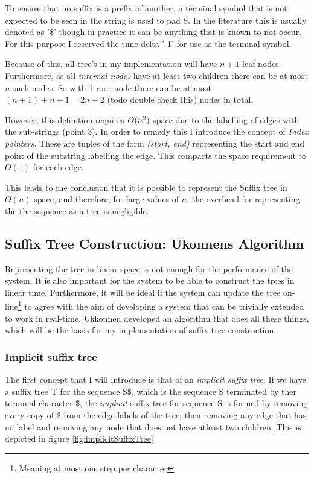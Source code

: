 \documentclass[12pt,twoside,notitlepage]{report}
\begin{document}
			To ensure that no suffix is a prefix of another, a terminal symbol that is not expected to be seen in the string is used to pad S. In the literature this is usually denoted as '\$' though in practice it can be anything that is known to not occur. For this purpose I reserved the time delta '-1' for use as the terminal symbol.

			Because of this, all tree's in my implementation will have $n+1$ leaf nodes. Furthermore, as all \emph{internal nodes} have at least two children there can be at most $n$ such nodes. So with 1 root node there can be at most $(n+1)+n+1 = 2n+2$ (todo double check this) nodes in total.
			
			However, this definition requires $O(n\textsuperscript{2})$ space due to the labelling of edges with the sub-strings (point 3). In order to remedy this I introduce the concept of \emph{Index pointers}. These are tuples of the form \emph{(start, end)} representing the start and end point of the substring labelling the edge. This compacts the space requirement to $\Theta(1)$ for each edge.
			
			This leads to the conclusion that it is possible to represent the Suffix tree in $\Theta(n)$ space, and therefore, for large values of $n$, the overhead for representing the the sequence as a tree is negligible.
			
			\subsection{\label{subsubsec:Ukonnens}Suffix Tree Construction: Ukonnens Algorithm}
			Representing the tree in linear space is not enough for the performance of the system. It is also important for the system to be able to construct the trees in linear time. Furthermore, it will be ideal if the system can update the tree on-line\footnote{Meaning at most one step per character} to agree with the aim of developing a system that can be trivially extended to work in real-time. Ukkonnen\cite{Ukkonen1995} developed an algorithm that does all these things, which will be the basis for my implementation of suffix tree construction.
			
			\subsubsection{Implicit suffix tree}
				The first concept that I will introduce is that of an \emph{implicit suffix tree}. If we have a suffix tree T for the sequence S\$, which is the sequence S terminated by ther terminal character \$, the \emph{implicit} suffix tree for sequence S is formed by removing every copy of \$ from the edge labels of the tree, then removing any edge that has no label and removing any node that does not have atleast two children. This is depicted in figure \ref{fig:implicitSuffixTree}
				
\end{document}
